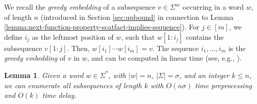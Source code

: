 \documentclass[10pt,a4paper]{amsart}
\theoremstyle{plain}
\newtheorem{lemma}{Lemma}
\theoremstyle{definition}
\begin{document}
We recall the {\em greedy embedding} of a subsequence $v \in \Sigma^m$ occurring in a word $w$, of length $n$ (introduced in Section \ref{sec:upbound} in connection to Lemma \ref{lemma:next-function-property-scatfact-implies-sequence}). For $j\in [m]$, we define $i_j$ as the leftmost position of $w$, such that $w[1:i_j]$ contains the subsequence $v[1:j]$. Then, $w[i_1]\cdots w[i_m]=v$. The sequence $i_1,\ldots,i_m$ is the {\em greedy embedding} of $v$ in $w$, and can be computed in linear time (see, e.g., \cite{DBLP:journals/fuin/KoscheKMS22}). 

\begin{lemma}\label{lemmaDFA}
Given a word $w \in \Sigma^*$, with $|w|=n$, $|\Sigma|=\sigma$, and an integer $k \leq n$, we can enumerate all subsequences of length $k$ with $O(n \sigma)$ time preprocessing and $O(k)$ time delay.
\end{lemma}
\end{document}
